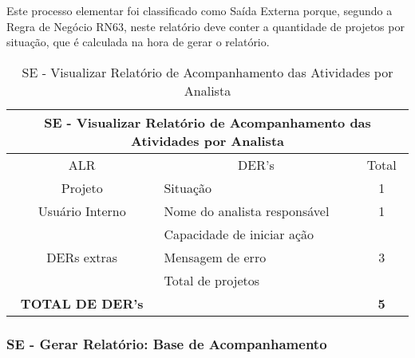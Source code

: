       Este processo elementar foi classificado como Saída Externa porque, segundo a Regra de Negócio RN63, neste relatório
    deve conter a quantidade de projetos por situação, que é calculada na hora de gerar o relatório.
      
      \begin{table}[!h]
      \centering
      \caption{SE - Visualizar Relatório de Acompanhamento das Atividades por Analista}
      \label{se_visualizar_relatorio_acompanhamento_analista}
      \begin{tabular}{|c|l|c|}
      \hline
      \multicolumn{3}{|c|}{SE - Visualizar Relatório de Acompanhamento das Atividades por Analista} \\ \hline
      ALR                               & \multicolumn{1}{c|}{DER's}       & Total                  \\ \hline
      Projeto                           & Situação                         & 1                      \\ \hline
      Usuário Interno                          & Nome do analista responsável     & 1                      \\ \hline
      \multirow{3}{*}{DERs extras}      & Capacidade de iniciar ação       & \multirow{3}{*}{3}     \\ \cline{2-2}
					& Mensagem de erro                 &                        \\ \cline{2-2}
					& Total de projetos                &                        \\ \hline
      \textbf{TOTAL DE DER's}           &                                  & \textbf{5}             \\ \hline
      \end{tabular}
      \end{table}
  

  \subsubsection{SE - Gerar Relatório: Base de Acompanhamento}
   
